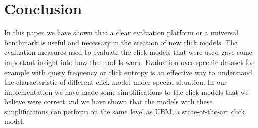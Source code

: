 \section{Conclusion}
\label{sec:conclusion}
In this paper we have shown that a clear evaluation platform or a universal benchmark is useful and necessary in the creation of new click models. The evaluation measures used to evaluate the click models that were used gave some important insight into how the models work. Evaluation over specific dataset for example with query frequency or click entropy is an effective way to understand the characteristic of different click model under special situation. In our implementation we have made some simplifications to the click models that we believe were correct and we have shown that the models with these simplifications can perform on the same level as UBM, a state-of-the-art click model. 
